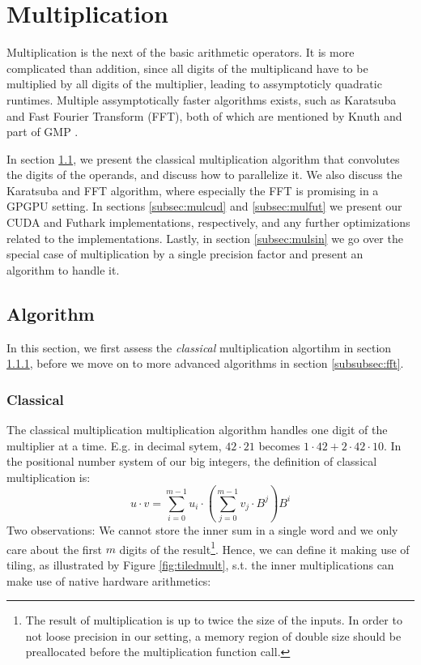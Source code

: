 \section{Multiplication}
\label{sec:mul}

Multiplication is the next of the basic arithmetic operators. It is more
complicated than addition, since all digits of the multiplicand have to be
multiplied by all digits of the multiplier, leading to assymptoticly quadratic
runtimes. Multiple assymptotically faster algorithms exists, such as Karatsuba
and Fast Fourier Transform (FFT), both of which are mentioned by Knuth and part
of GMP \cite{knuth97} \cite{GMP}.

In section \ref{subsec:mulalg}, we present the classical multiplication
algorithm that convolutes the digits of the operands, and discuss how to
parallelize it. We also discuss the Karatsuba and FFT algorithm, where
especially the FFT is promising in a GPGPU setting. In sections
\ref{subsec:mulcud} and \ref{subsec:mulfut} we present our CUDA and Futhark
implementations, respectively, and any further optimizations related to the
implementations. Lastly, in section \ref{subsec:mulsin} we go over the special
case of multiplication by a single precision factor and present an algorithm to
handle it.

\subsection{Algorithm}
\label{subsec:mulalg}

In this section, we first assess the \textit{classical} multiplication algortihm
in section \ref{subsubsec:classical}, before we move on to more advanced
algorithms in section \ref{subsubsec:fft}.

\subsubsection{Classical}
\label{subsubsec:classical}
The classical multiplication multiplication algorithm handles one digit of the
multiplier at a time. E.g. in decimal sytem, $42\cdot 21$ becomes
$1 \cdot 42 + 2 \cdot 42 \cdot 10$. In the positional number system of our big integers, the
definition of classical multiplication is:
\begin{equation}
  \label{eq:clasmul0}
  u \cdot v = \sum_{i=0}^{m-1}u_i\cdot \left( \sum_{j=0}^{m-1}v_j\cdot B^{j} \right)B^{i}
\end{equation}
Two observations: We cannot store the inner sum in a single word and we only
care about the first $m$ digits of the result\footnote{The result of
  multiplication is up to twice the size of the inputs. In order to not loose
  precision in our setting, a memory region of double size should be
  preallocated before the multiplication function call.}.  Hence, we can define
it making use of tiling, as illustrated by Figure \ref{fig:tiledmult}, s.t. the
inner multiplications can make use of native hardware arithmetics:

